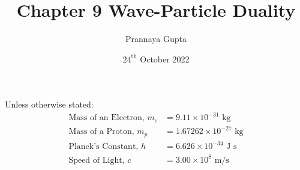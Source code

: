 \documentclass[a4paper, 12pt, addpoints]{exam}
\title{Chapter 9 \textbf{Wave-Particle Duality}}
\author{Prannaya Gupta}
\date{$24^{\text{th}}$ October 2022}
\begin{document}
\maketitle


\begin{tcolorbox}
Unless otherwise stated:
\begin{align*}
\text{Mass of an Electron, }m_e &= 9.11 \times 10^{-31}\text{ kg} \\
\text{Mass of a Proton, }m_p &= 1.67262 \times 10^{-27}\text{ kg} \\
\text{Planck's Constant, }h &= 6.626 \times 10^{-34}\text{ J s} \\
\text{Speed of Light, }c &= 3.00 \times 10^8 \text{ m/s}
\end{align*}
\end{tcolorbox}
\newpage
\end{document}
